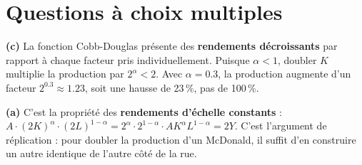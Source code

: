 




\section{Questions à choix multiples}

\setcounter{qcmcounter}{0}


\begin{reponse}
\textbf{(c)} La fonction Cobb-Douglas présente des \textbf{rendements décroissants} par rapport à chaque facteur pris individuellement. Puisque $\alpha < 1$, doubler $K$ multiplie la production par $2^{\alpha} < 2$. Avec $\alpha = 0.3$, la production augmente d'un facteur $2^{0.3} \approx 1.23$, soit une hausse de 23\,\%, pas de 100\,\%.
\end{reponse}


\begin{reponse}
\textbf{(a)} C'est la propriété des \textbf{rendements d'échelle constants} : $A \cdot (2K)^{\alpha} \cdot (2L)^{1-\alpha} = 2^{\alpha} \cdot 2^{1-\alpha} \cdot A K^{\alpha} L^{1-\alpha} = 2Y$. C'est l'argument de réplication : pour doubler la production d'un McDonald, il suffit d'en construire un autre identique de l'autre côté de la rue.
\end{reponse}

